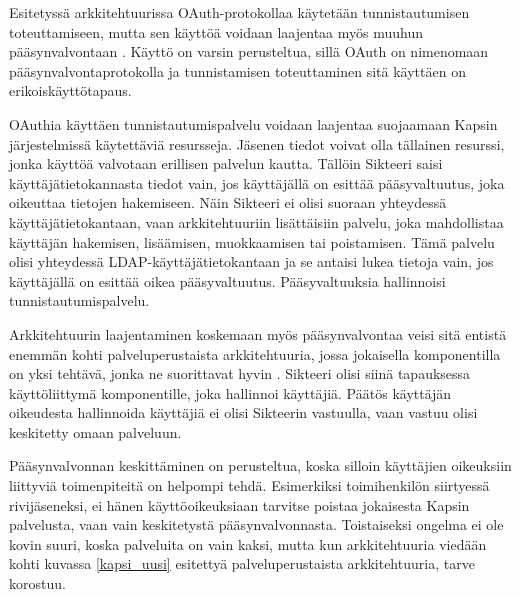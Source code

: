 Esitetyssä arkkitehtuurissa OAuth-protokollaa käytetään tunnistautumisen toteuttamiseen, mutta sen käyttöä voidaan laajentaa myös muuhun pääsynvalvontaan \cite{distributed_web_security}. Käyttö on varsin perusteltua, sillä OAuth on nimenomaan pääsynvalvontaprotokolla ja tunnistamisen toteuttaminen sitä käyttäen on erikoiskäyttötapaus.

OAuthia käyttäen tunnistautumispalvelu voidaan laajentaa suojaamaan Kapsin järjestelmissä käytettäviä resursseja. Jäsenen tiedot voivat olla tällainen resurssi, jonka käyttöä valvotaan erillisen pal\-ve\-lun kautta. Tällöin Sikteeri saisi käyttäjätietokannasta tiedot vain, jos käyttäjällä on esittää pääsyvaltuutus, joka oikeuttaa tietojen hakemiseen. Näin Sikteeri ei olisi suoraan yhteydessä käyttäjätietokantaan, vaan arkkitehtuuriin lisättäisiin palvelu, joka mahdollistaa käyttäjän hakemisen, lisäämisen, muokkaamisen tai poistamisen. Tämä palvelu olisi yhteydessä LDAP-käyttäjätietokantaan ja se antaisi lukea tietoja vain, jos käyttäjällä on esittää oikea pääsyvaltuutus. Pääsyvaltuuksia hallinnoisi tunnistautumispalvelu.

Arkkitehtuurin laajentaminen koskemaan myös pääsynvalvontaa veisi sitä entistä enemmän kohti palveluperustaista arkkitehtuuria, jossa jokaisella komponentilla on yksi tehtävä, jonka ne suorittavat hyvin \cite{soa}. Sikteeri olisi siinä tapauksessa käyttöliittymä komponentille, joka hallinnoi käyttäjiä. Päätös käyttäjän oikeudesta hallinnoida käyttäjiä ei olisi Sikteerin vastuulla, vaan vastuu olisi keskitetty omaan palveluun.

Pääsynvalvonnan keskittäminen on perusteltua, koska silloin käyttäjien oikeuksiin liittyviä toimenpiteitä on helpompi tehdä. Esimerkiksi toimihenkilön siirtyessä rivijäseneksi, ei hänen käyttöoikeuksiaan tarvitse poistaa jokaisesta Kapsin palvelusta, vaan vain keskitetystä pääsynvalvonnasta. Toistaiseksi ongelma ei ole kovin suuri, koska palveluita on vain kaksi, mutta kun arkkitehtuuria viedään kohti kuvassa \ref{kapsi_uusi} esitettyä palveluperustaista arkkitehtuuria, tarve korostuu.